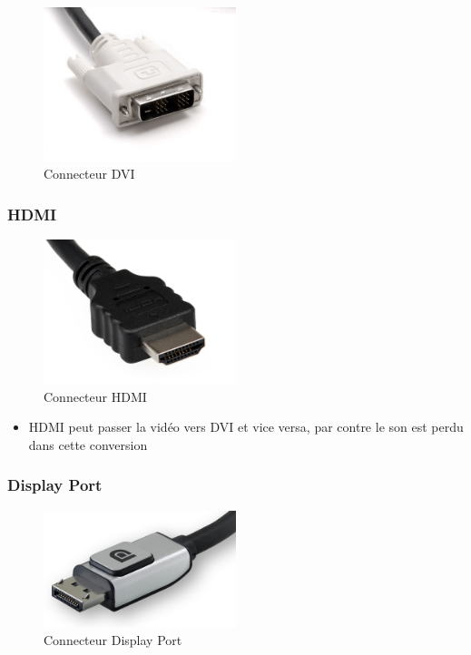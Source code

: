 \documentclass[
  french,
]{book}
\providecommand{\tightlist}{%
  \setlength{\itemsep}{0pt}\setlength{\parskip}{0pt}}
\begin{document}
\begin{figure}
\centering
\includegraphics[width=0.5\textwidth,height=\textheight]{medias/lexique/signaux/numerique/dvi.jpg}
\caption{Connecteur DVI}
\end{figure}

\hypertarget{hdmi}{%
\subsubsection{HDMI}\label{hdmi}}

\begin{figure}
\centering
\includegraphics[width=0.5\textwidth,height=\textheight]{medias/lexique/signaux/numerique/hdmi.jpg}
\caption{Connecteur HDMI}
\end{figure}

\begin{itemize}
\tightlist
\item
  HDMI peut passer la vidéo vers DVI et vice versa, par contre le son est perdu dans cette conversion
\end{itemize}

\hypertarget{display-port}{%
\subsubsection{Display Port}\label{display-port}}

\begin{figure}
\centering
\includegraphics[width=0.5\textwidth,height=\textheight]{medias/lexique/signaux/numerique/displayport.jpg}
\caption{Connecteur Display Port}
\end{figure}
\end{document}
